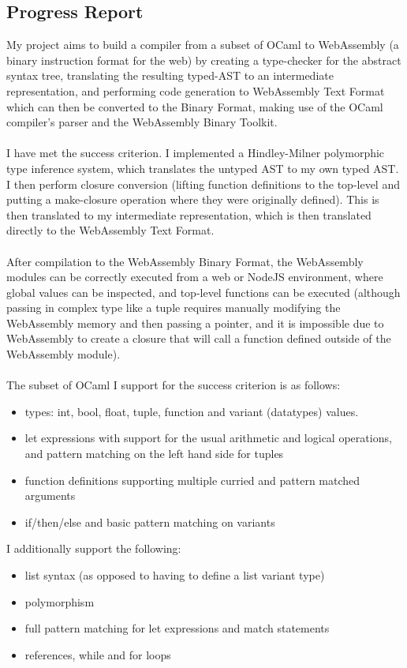 \documentclass[12pt]{article}
\begin{document}
	\subsection*{Progress Report}
	My project aims to build a compiler from a subset of OCaml to WebAssembly (a binary instruction format for the web) by creating a type-checker for the abstract syntax tree, translating the resulting typed-AST to an intermediate representation, and performing code generation to WebAssembly Text Format which can then be converted to the Binary Format, making use of the OCaml compiler's parser and the WebAssembly Binary Toolkit.
	\\\\
	I have met the success criterion. I implemented a Hindley-Milner polymorphic type inference system, which translates the untyped AST to my own typed AST. I then perform closure conversion (lifting function definitions to the top-level and putting a make-closure operation where they were originally defined). This is then translated to my intermediate representation, which is then translated directly to the WebAssembly Text Format.
	\\\\
	After compilation to the WebAssembly Binary Format, the WebAssembly modules can be correctly executed from a web or NodeJS environment, where global values can be inspected, and top-level functions can be executed (although passing in complex type like a  tuple requires manually modifying the WebAssembly memory and then passing a pointer, and it is impossible due to WebAssembly to create a closure that will call a function defined outside of the WebAssembly module).
	\\\\
	The subset of OCaml I support for the success criterion is as follows:
	\begin{itemize}
		\item types: int, bool, float, tuple, function and variant (datatypes) values.
		\item let expressions with support for the usual arithmetic and logical operations, and pattern matching on the left hand side for tuples
		\item function definitions supporting multiple curried and pattern matched arguments
		\item if/then/else and basic pattern matching on variants
	\end{itemize}
    I additionally support the following:
    \begin{itemize}
    	\item list syntax (as opposed to having to define a list variant type)
    	\item polymorphism
    	\item full pattern matching for let expressions and match statements
    	\item references, while and for loops
    \end{itemize}
\end{document}
